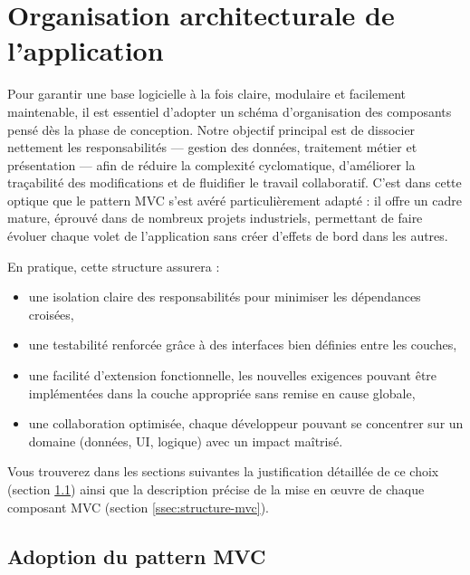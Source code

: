 \documentclass[a4paper,11pt]{report}
\begin{document}
\newpage
\section{Organisation architecturale de l’application}
\label{sec:organisation-archi}

Pour garantir une base logicielle à la fois claire, modulaire et facilement maintenable, il est essentiel d’adopter un schéma d’organisation des composants pensé dès la phase de conception. Notre objectif principal est de dissocier nettement les responsabilités — gestion des données, traitement métier et présentation — afin de réduire la complexité cyclomatique, d’améliorer la traçabilité des modifications et de fluidifier le travail collaboratif. C’est dans cette optique que le pattern MVC s’est avéré particulièrement adapté : il offre un cadre mature, éprouvé dans de nombreux projets industriels, permettant de faire évoluer chaque volet de l’application sans créer d’effets de bord dans les autres.  

En pratique, cette structure assurera :
\begin{itemize}
  \item une isolation claire des responsabilités pour minimiser les dépendances croisées,  
  \item une testabilité renforcée grâce à des interfaces bien définies entre les couches,  
  \item une facilité d’extension fonctionnelle, les nouvelles exigences pouvant être implémentées dans la couche appropriée sans remise en cause globale,  
  \item une collaboration optimisée, chaque développeur pouvant se concentrer sur un domaine (données, UI, logique) avec un impact maîtrisé.  
\end{itemize}

Vous trouverez dans les sections suivantes la justification détaillée de ce choix (section \ref{ssec:adoption-mvc}) ainsi que la description précise de la mise en œuvre de chaque composant MVC (section \ref{ssec:structure-mvc}).

\subsection{Adoption du pattern MVC}
\label{ssec:adoption-mvc}
\end{document}
